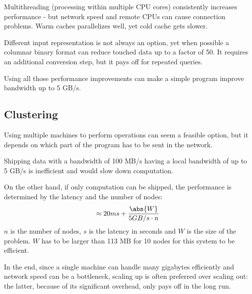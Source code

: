 Multithreading (processing within multiple CPU cores) consistently increases performance - but network speed and remote CPUs can cause connection problems. Warm caches parallelizes well, yet cold cache gets slower.

Different input representation is not always an option, yet when possible a columnar binary format can reduce touched data up to a factor of 50. It requires an additional conversion step, but it pays off for repeated queries.

Using all those performance improvements can make a simple program improve bandwidth up to 5 GB/s. 

\subsection{Clustering}
Using multiple machines to perform operations can seem a feasible option, but it depends on which part of the program has to be sent in the network.

Shipping data with a bandwidth of 100 MB/s having a local bandwidth of up to 5 GB/s is inefficient and would slow down computation.

On the other hand, if only computation can be shipped, the performance is determined by the latency and the number of nodes:
$$\approx 20ms + \frac{\abs{W}}{5GB / s \cdot n}$$
$n$ is the number of nodes, $s$ is the latency in seconds and $W$ is the size of the problem. $W$ has to be larger than 113 MB for 10 nodes for this system to be efficient.

In the end, since a single machine can handle many gigabytes efficiently and network speed can be a bottleneck, scaling up is often preferred over scaling out: the latter, because of its significant overhead, only pays off in the long run.
